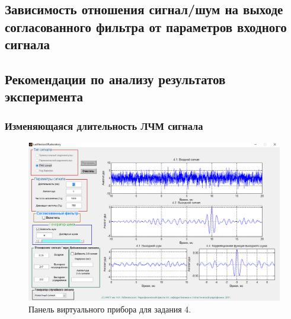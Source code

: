 

\newcommand{\df}{\Delta f_{\text{дев}}}
\subsection{Зависимость отношения сигнал/шум на выходе согласованного
фильтра от параметров входного сигнала}

\subsection*{Рекомендации по анализу результатов эксперимента}



\subsubsection{Изменяющаяся длительность ЛЧМ сигнала}%


\label{ssub:izmeniaiushchaiasia_dlitel_nost_signala_tau_}

\begin{figure}[h!]
    \centering
    \includegraphics[width=\linewidth]{python/task4/t4s4_10_0}
    \caption{Панель виртуального прибора для задания 4.}
    \label{fig:4.1}
\end{figure}


